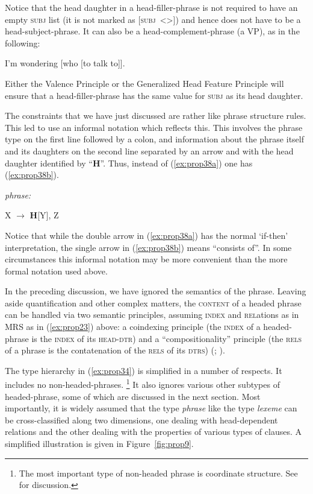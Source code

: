 \documentclass[output=paper
	        ,collection
	        ,collectionchapter
 	        ,biblatex
                ,babelshorthands
                ,newtxmath
                ,draftmode
                ,colorlinks, citecolor=brown
]{langscibook}
\begin{document}
Notice that the head daughter in a head-filler-phrase is not required to have an empty \textsc{subj} list (it is not marked as [\textsc{subj}~<>]) and hence does not have to be a head-subject-phrase. It can also be a head-complement-phrase (a VP), as in the following:

\ea\label{ex:prop37}
I’m wondering [who [to talk to]].
\z

Either the Valence Principle or the Generalized Head Feature Principle will ensure that a head-filler-phrase has the same value for \textsc{subj} as its head daughter.

The constraints that we have just discussed are rather like phrase structure rules. This led \citet[33]{GSag2000a-u} to use an informal notation which reflects this. This involves the phrase type on the first line followed by a colon, and information about the phrase itself and its daughters on the second line separated by an arrow and with the head daughter identified by ``\textbf{H}''. Thus, instead of (\ref{ex:prop38a}) one has (\ref{ex:prop38b}).

\ea\label{ex:prop38}
	\ea\label{ex:prop38a}
	 \impl
	\ex\label{ex:prop38b}
	\emph{phrase:}
	
	X $\to$ \textbf{H}[Y], Z
	\z
\z

Notice that while the double arrow in (\ref{ex:prop38a}) has the normal `if-then' interpretation, the single arrow in (\ref{ex:prop38b}) means ``consists of''. In some circumstances this informal notation may be more convenient than the more formal notation used above.

In the preceding discussion, we have ignored the semantics of the phrase. Leaving aside quantification and other complex matters, the \textsc{content} of a headed phrase can be handled via two semantic principles, assuming \textsc{index} and \textsc{rel}ations as in MRS as in (\ref{ex:prop23}) above: a coindexing principle (the \textsc{index} of a headed-phrase is the \textsc{index} of its \textsc{head-dtr}) and a ``compositionality'' principle (the \textsc{rels} of a phrase is the contatenation of the \textsc{rels} of its \textsc{dtrs}) (\citealp{CFPS2005a}; ).

The type hierarchy in (\ref{ex:prop34}) is simplified in a number of respects. It includes no non-headed-phrases.%
%
\footnote{The most important type of non-headed phrase is coordinate structure. See  for discussion.}
%
It also ignores various other subtypes of headed-phrase, some of which are discussed in the next section. Most importantly, it is widely assumed that the type \emph{phrase} like the type \emph{lexeme} can be cross-classified along two dimensions, one dealing with head-dependent relations and the other dealing with the properties of various types of clauses. A simplified illustration is given in Figure~\ref{fig:prop9}.
\end{document}
